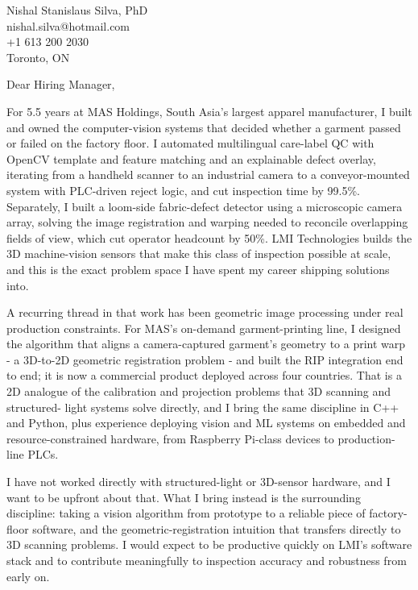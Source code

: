 \documentclass[11pt]{article}
\begin{document}
\pagestyle{empty}

\begin{flushright}
Nishal Stanislaus Silva, PhD \\
nishal.silva@hotmail.com \\
+1 613 200 2030 \\
Toronto, ON
\end{flushright}

\noindent Dear Hiring Manager,

\vspace{0.5em}
\noindent For 5.5 years at MAS Holdings, South Asia's largest apparel manufacturer, I built and
owned the computer-vision systems that decided whether a garment passed or failed on the factory
floor. I automated multilingual care-label QC with OpenCV template and feature matching and an
explainable defect overlay, iterating from a handheld scanner to an industrial camera to a
conveyor-mounted system with PLC-driven reject logic, and cut inspection time by 99.5\%. Separately,
I built a loom-side fabric-defect detector using a microscopic camera array, solving the image
registration and warping needed to reconcile overlapping fields of view, which cut operator
headcount by 50\%. LMI Technologies builds the 3D machine-vision sensors that make this class of
inspection possible at scale, and this is the exact problem space I have spent my career shipping
solutions into.

\vspace{0.5em}
\noindent A recurring thread in that work has been geometric image processing under real production
constraints. For MAS's on-demand garment-printing line, I designed the algorithm that aligns a
camera-captured garment's geometry to a print warp - a 3D-to-2D geometric registration problem - and
built the RIP integration end to end; it is now a commercial product deployed across four countries.
That is a 2D analogue of the calibration and projection problems that 3D scanning and structured-
light systems solve directly, and I bring the same discipline in C++ and Python, plus experience
deploying vision and ML systems on embedded and resource-constrained hardware, from Raspberry
Pi-class devices to production-line PLCs.

\vspace{0.5em}
\noindent I have not worked directly with structured-light or 3D-sensor hardware, and I want to be
upfront about that. What I bring instead is the surrounding discipline: taking a vision algorithm
from prototype to a reliable piece of factory-floor software, and the geometric-registration
intuition that transfers directly to 3D scanning problems. I would expect to be productive quickly
on LMI's software stack and to contribute meaningfully to inspection accuracy and robustness from
early on.
\end{document}
